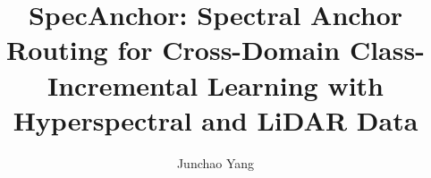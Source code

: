 \documentclass[journal]{IEEEtran}
\begin{document}
\title{SpecAnchor: Spectral Anchor Routing for Cross-Domain Class-Incremental Learning with Hyperspectral and LiDAR Data}

\renewcommand{\methodname}{SpecAnchor}
\renewcommand{\backbonename}{SpectralAnchorNet}

\author{Junchao Yang}

\maketitle











   
\end{document}
